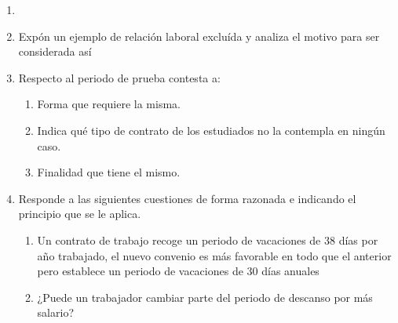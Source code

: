 \begin{enumerate}[label=\alph*]
    \item
    \item Expón un ejemplo de relación laboral excluída y analiza el motivo para ser considerada así
    \item Respecto al periodo de prueba contesta a:
    \begin{enumerate}[label=\arabic*]
        \item Forma que requiere la misma.
        \item Indica qué tipo de contrato de los estudiados no la contempla en ningún caso.
        \item Finalidad que tiene el mismo.
    \end{enumerate}
    \item Responde a las siguientes cuestiones de forma razonada e indicando el principio que se le aplica.
    \begin{enumerate}[label=\arabic*]
        \item Un contrato de trabajo recoge un periodo de vacaciones de 38 días por año trabajado, el nuevo convenio es más favorable en todo que el anterior pero establece un periodo de vacaciones de 30 días anuales
        \item ¿Puede un trabajador cambiar parte del periodo de descanso por más salario?
    \end{enumerate}
    \end{enumerate}









\newpage



